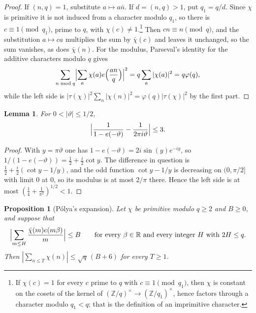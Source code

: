 \documentclass[11pt]{amsart}
\newtheorem{proposition}[theorem]{Proposition}
\newtheorem{lemma}[theorem]{Lemma}
\theoremstyle{definition}
\theoremstyle{remark}
\numberwithin{equation}{section}
\newcommand{\e}{e}
\begin{document}
\begin{proof}
If $(n,q)=1$, substitute $a\mapsto a\bar n$. If $d=(n,q)>1$, put $q_1=q/d$.
Since $\chi$ is primitive it is not induced from a character modulo $q_1$, so
there is $c\equiv1\pmod{q_1}$, prime to $q$, with $\chi(c)\ne1$.\footnote{If
$\chi(c)=1$ for every $c$ prime to $q$ with $c\equiv1\pmod {q_1}$, then $\chi$
is constant on the cosets of the kernel of $(\mathbb Z/q)^\times\to(\mathbb
Z/q_1)^\times$, hence factors through a character modulo $q_1<q$; that is the
definition of an imprimitive character.} Then $cn\equiv n\pmod q$, and the
substitution $a\mapsto ca$ multiplies the sum by $\bar\chi(c)$ and leaves it
unchanged, so the sum vanishes, as does $\bar\chi(n)$. For the modulus,
Parseval's identity for the additive characters modulo $q$ gives
\[
\sum_{n\bmod q}\Bigl|\sum_{a}\chi(a)\e\Bigl(\frac{an}q\Bigr)\Bigr|^2=q\sum_a|\chi(a)|^2=q\varphi(q),
\]
while the left side is $|\tau(\chi)|^2\sum_n|\chi(n)|^2=\varphi(q)|\tau(\chi)|^2$
by the first part.
\end{proof}

\begin{lemma}\label{lem:geom}
For $0<|\vartheta|\le1/2$,
\[
\Bigl|\frac1{1-\e(-\vartheta)}-\frac1{2\pi i\vartheta}\Bigr|\le3 .
\]
\end{lemma}

\begin{proof}
With $y=\pi\vartheta$ one has $1-\e(-\vartheta)=2i\sin(y)\e^{-iy}$, so
$1/(1-\e(-\vartheta))=\frac12+\frac i2\cot y$. The difference in question is
$\frac12+\frac i2(\cot y-1/y)$, and the odd function $\cot y-1/y$ is
decreasing on $(0,\pi/2]$ with limit $0$ at $0$, so its modulus is at most
$2/\pi$ there. Hence the left side is at most $(\frac14+\frac1{\pi^2})^{1/2}<1$.
\end{proof}

\begin{proposition}[P\'olya's expansion]\label{prop:polya}
Let $\chi$ be primitive modulo $q\ge2$ and $B\ge0$, and suppose that
\[
\Bigl|\sum_{m\le H}\frac{\bar\chi(m)\e(m\beta)}m\Bigr|\le B\qquad\text{for
every }\beta\in\mathbb R\text{ and every integer }H\text{ with }2H\le q.
\]
Then $|\sum_{n\le T}\chi(n)|\le\sqrt q\,(B+6)$ for every $T\ge1$.
\end{proposition}
\end{document}

